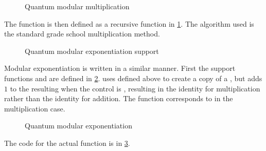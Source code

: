 \begin{figure}[htbp]

\caption{Quantum modular multiplication}\label{fig:quantummodularmultiply}
\end{figure}

The function   is then
defined as a recursive function in \ref{fig:quantummodularmultiply}.  The
algorithm used  is the standard grade school multiplication method.



\begin{figure}[htbp]

\caption{Quantum modular exponentiation support}\label{fig:quantummodularexpsupport}
\end{figure}


Modular exponentiation is written in a similar manner. 
First the support functions  and  are
defined in \ref{fig:quantummodularexpsupport}.  
uses  defined above to create a copy of a ,
but adds $1$ to the resulting  when the 
control \qubit{} is , resulting in the identity for multiplication
rather than the identity for addition. The function  
corresponds to  in the multiplication case. 


\begin{figure}[htbp]

\caption{Quantum modular exponentiation}\label{fig:quantummodularexp}
\end{figure}

 The code
for the actual  function is in \ref{fig:quantummodularexp}.


